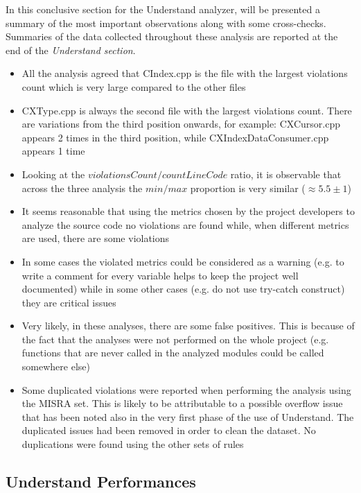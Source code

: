 In this conclusive section for the Understand analyzer, will be presented a summary of the most important observations along with some cross-checks. Summaries of the data collected throughout these analysis are reported at the end of the \textsl{Understand section}.\newline
\begin{itemize}
	\item All the analysis agreed that CIndex.cpp is the file with the largest violations count which is very large compared to the other files
	\item CXType.cpp is always the second file with the largest violations count. There are variations from the third position onwards, for example: CXCursor.cpp appears 2 times in the third position, while CXIndexDataConsumer.cpp appears 1 time
	\item Looking at the $violationsCount/countLineCode$ ratio, it is observable that across the three analysis the $min/max$ proportion is very similar ($\approx 5.5 \pm 1$)
	\item It seems reasonable that using the metrics chosen by the project developers to analyze the source code no violations are found while, when different metrics are used, there are some violations
	\item In some cases the violated metrics could be considered as a warning (e.g. to write a comment for every variable helps to keep the project well documented) while in some other cases (e.g. do not use try-catch construct) they are critical issues
	\item Very likely, in these analyses, there are some false positives. This is because of the fact that the analyses were not performed on the whole project (e.g. functions that are never called in the analyzed modules could be called somewhere else)
	\item Some duplicated violations were reported when performing the analysis using the MISRA set. This is likely to be attributable to a possible overflow issue that has been noted also in the very first phase of the use of Understand. The duplicated issues had been removed in order to clean the dataset. No duplications were found using the other sets of rules
\end{itemize}

\subsection{Understand Performances}

